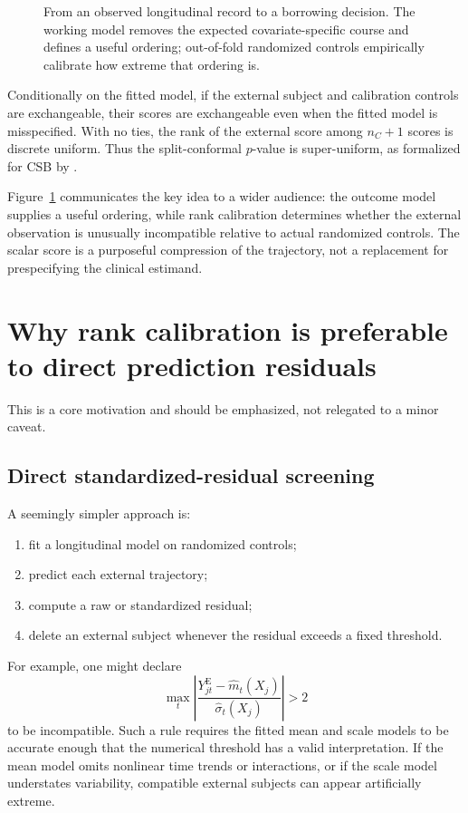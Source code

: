 \documentclass[11pt]{article}
\newcommand{\E}{\mathrm{E}}
\newcommand{\fullfig}[1]{\resizebox{\linewidth}{!}{}}
\begin{document}
\begin{figure}[!ht]
\centering
\fullfig{score_pipeline.tex}
\caption{From an observed longitudinal record to a borrowing decision. The working model removes the expected covariate-specific course and defines a useful ordering; out-of-fold randomized controls empirically calibrate how extreme that ordering is.}
\label{fig:basicrank}
\end{figure}

Conditionally on the fitted model, if the external subject and calibration controls are exchangeable, their scores are exchangeable even when the fitted model is misspecified. With no ties, the rank of the external score among $n_C+1$ scores is discrete uniform. Thus the split-conformal $p$-value is super-uniform, as formalized for CSB by \citet{zhu2025csb}.

Figure~\ref{fig:basicrank} communicates the key idea to a wider audience: the outcome model supplies a useful ordering, while rank calibration determines whether the external observation is unusually incompatible relative to actual randomized controls. The scalar score is a purposeful compression of the trajectory, not a replacement for prespecifying the clinical estimand.

\section{Why rank calibration is preferable to direct prediction residuals}

This is a core motivation and should be emphasized, not relegated to a minor caveat.

\subsection{Direct standardized-residual screening}

A seemingly simpler approach is:
\begin{enumerate}
    \item fit a longitudinal model on randomized controls;
    \item predict each external trajectory;
    \item compute a raw or standardized residual;
    \item delete an external subject whenever the residual exceeds a fixed threshold.
\end{enumerate}

For example, one might declare
\[
\max_t\left|
\frac{Y_{jt}^{\E}-\widehat m_t(X_j)}{\widehat\sigma_t(X_j)}
\right|>2
\]
to be incompatible. Such a rule requires the fitted mean and scale models to be accurate enough that the numerical threshold has a valid interpretation. If the mean model omits nonlinear time trends or interactions, or if the scale model understates variability, compatible external subjects can appear artificially extreme.
\end{document}

